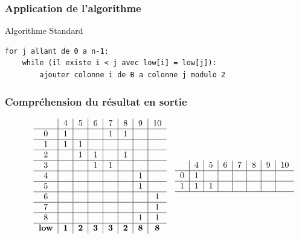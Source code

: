 \documentclass{beamer}
\begin{document}
\begin{frame}[fragile]
    \frametitle{Application de l'algorithme}
    \begin{block}{Algorithme Standard}
        \fontsize{9.5}{10}\selectfont
        \begin{lstlisting}
for j allant de 0 a n-1:
    while (il existe i < j avec low[i] = low[j]):
        ajouter colonne i de B a colonne j modulo 2
      \end{lstlisting}
    \end{block}
\end{frame}


\begin{frame}
    \frametitle{Compréhension du résultat en sortie}
    \fontsize{8}{10}\selectfont
    \begin{figure}
        \begin{math}
        \begin{array}{cc}
            \begin{tabular}{ c | c | c | c | c | c | c | c }
                  & 4 & 5 & 6 & 7 & 8 & 9 & 10 \\ \hline
                0 & 1 &   &   & 1 & 1 &   &    \\ \hline
                1 & 1 & 1 &   &   &   &   &    \\ \hline
                2 &   & 1 & 1 &   & 1 &   &    \\ \hline
                3 &   &   & 1 & 1 &   &   &    \\ \hline
                4 &   &   &   &   &   & 1 &    \\ \hline
                5 &   &   &   &   &   & 1 &    \\ \hline
                6 &   &   &   &   &   &   & 1  \\ \hline
                7 &   &   &   &   &   &   & 1  \\ \hline
                8 &   &   &   &   &   & 1 & 1  \\ \hline
                \textbf{low} & \textbf{1} & \textbf{2} & \textbf{3} & 
                \textbf{3} & \textbf{2} & \textbf{8} & \textbf{8}
            \end{tabular} & 
            \begin{tabular}{ c | c | c | c | c | c | c | c }
                  & 4 & 5 & 6 & 7 & 8 & 9 & 10 \\ \hline
                0 & 1 &   &   &   &   &   &    \\ \hline
                1 & 1 & 1 &   &   &   &   &    \\ \hline

\end{tabular}
\end{array}
\end{math}
\end{figure}
\end{frame}
\end{document}
